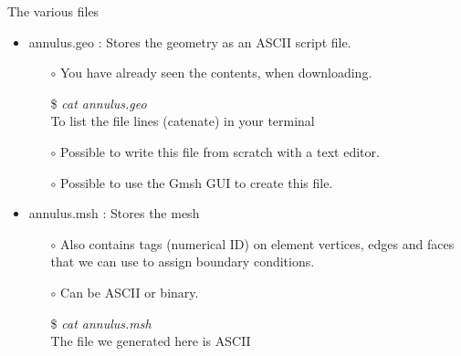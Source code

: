 \documentclass[t]{beamer}
\begin{document}
\begin{frame}{The various files}
   \begin{itemize}
      \item annulus.geo : Stores the geometry as an ASCII script file.
      \begin{itemize}
         \item[$\circ$] You have already seen the contents, when downloading.
         \item[\$] \emph{cat annulus.geo} \\ \hspace{10pt} To list the file lines (catenate) in your terminal
         \item[$\circ$] Possible to write this file from scratch with a text editor.
         \item[$\circ$] Possible to use the Gmsh GUI to create this file.
      \end{itemize}\vspace{10pt}
      \item annulus.msh : Stores the mesh
      \begin{itemize}
         \item[$\circ$] Also contains tags (numerical ID) on element vertices, edges and faces that we can use to assign boundary conditions.
         \item[$\circ$] Can be ASCII or binary.
         \item[\$] \emph{cat annulus.msh} \\ \hspace{10pt} The file we generated here is ASCII
      \end{itemize}
   \end{itemize}
\end{frame}
\end{document}
